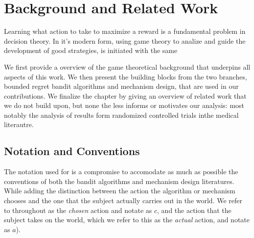 \chapter{Background and Related Work}
\label{cha:background}






Learning what action to take to maximize a reward is a fundamental problem in decision theory. In it's modern form, using game theory to analize and guide the development of good strategies, is initiated with the same


We first provide a overview of the game theoretical background that underpins all aspects of this work.
We then present the building blocks from the two branches, bounded regret bandit algorithms and mechanism design, that are used in our contributions.
We finalize the chapter by giving an overview of related work that we do not build upon, but none the less informs or motivates our analysis: most notably the analysis of results form randomized controlled trials inthe medical literautre. 



\section{Notation and Conventions}


The notation used for is a compromise to accomodate as much as possible the conventions of both the bandit algorithms and mechanism design literatures. While adding the distinction between the action the algorithm or mechanism chooses and the one that the subject actually carries out in the world. We refer to throughout as the \emph{chosen} action and notate as $c$, and the action that the subject takes on the world, which we refer to this as the \emph{actual} action, and notate as $a$).

